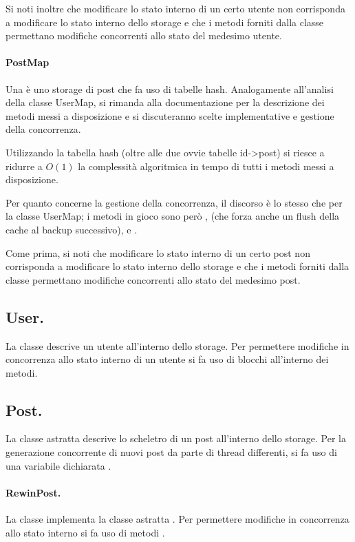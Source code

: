 \documentclass[11pt, italian, openany]{book}
\begin{document}
\begin{sloppypar}
Si noti inoltre che modificare lo stato interno di un certo utente non corrisponda a modificare lo stato interno dello storage e che i metodi
forniti dalla classe  permettano modifiche concorrenti allo stato del medesimo utente.

\paragraph*{PostMap}
Una  \`e uno storage di post che fa uso di tabelle hash. Analogamente all'analisi della classe UserMap, si rimanda alla
documentazione per la descrizione dei metodi messi a disposizione e si discuteranno scelte implementative e gestione della concorrenza.

Utilizzando la tabella hash  (oltre alle due ovvie tabelle id->post) si riesce a ridurre a \(O(1)\) la complessit\`a
algoritmica in tempo di tutti i metodi messi a disposizione.

Per quanto concerne la gestione della concorrenza, il discorso \`e lo stesso che per la classe UserMap; i metodi in gioco sono per\`o
,  (che forza anche un flush della cache al backup successivo),  e
.

Come prima, si noti che modificare lo stato interno di un certo post non corrisponda a modificare lo stato interno dello storage e che i metodi
forniti dalla classe  permettano modifiche concorrenti allo stato del medesimo post.

\subsection{User.}
La classe  descrive un utente all'interno dello storage. Per permettere modifiche in concorrenza allo stato interno di un utente
si fa uso di blocchi  all'interno dei metodi.

\subsection{Post.}
La classe astratta  descrive lo scheletro di un post all'interno dello storage. Per la generazione concorrente di nuovi post da
parte di thread differenti, si fa uso di una variabile  dichiarata .

\paragraph*{RewinPost.}
La classe  implementa la classe astratta . Per permettere modifiche in concorrenza allo stato interno
si fa uso di metodi .


\end{sloppypar}
\end{document}
